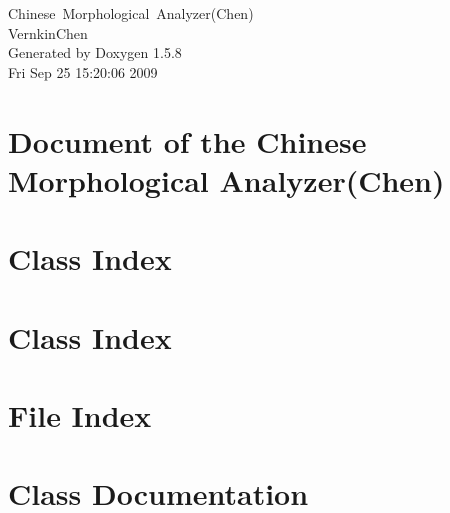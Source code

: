 \documentclass[a4paper]{book}
\begin{document}
\begin{titlepage}
\vspace*{7cm}
\begin{center}
{\Large Chinese~Morphological~Analyzer(Chen) \\[1ex]\large VernkinChen }\\
\vspace*{1cm}
{\large Generated by Doxygen 1.5.8}\\
\vspace*{0.5cm}
{\small Fri Sep 25 15:20:06 2009}\\
\end{center}
\end{titlepage}
\clearemptydoublepage
{}
\tableofcontents
\clearemptydoublepage
{}
\chapter{Document of the Chinese Morphological Analyzer(Chen)}
\label{index}
\chapter{Class Index}

\chapter{Class Index}

\chapter{File Index}

\chapter{Class Documentation}

































\end{document}
